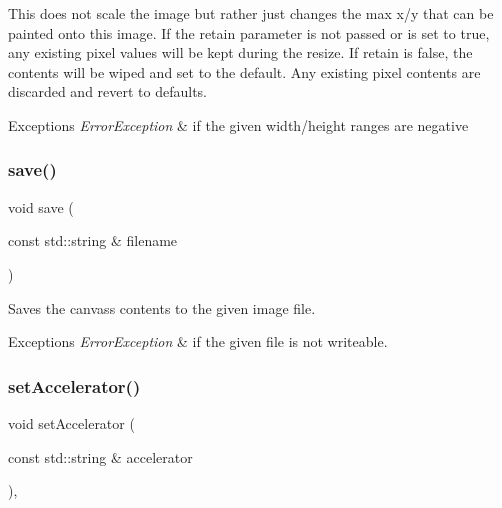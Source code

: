 This does not scale the image but rather just changes the max x/y that can be painted onto this image. If the \textquotesingle{}retain\textquotesingle{} parameter is not passed or is set to true, any existing pixel values will be kept during the resize. If \textquotesingle{}retain\textquotesingle{} is false, the contents will be wiped and set to the default. Any existing pixel contents are discarded and revert to defaults. 
\begin{DoxyExceptions}{Exceptions}
{\em Error\+Exception} & if the given width/height ranges are negative \\
\hline
\end{DoxyExceptions}
\mbox{\label{classsgl_1_1GCanvas_a2c027edbcd25b820dc6e21a9a3ad0496}} 
\subsubsection{\texorpdfstring{save()}{save()}}
{\footnotesize\ttfamily void save (\begin{DoxyParamCaption}\item[{const std\+::string \&}]{filename }\end{DoxyParamCaption})\hspace{0.3cm}{\ttfamily [virtual]}}



Saves the canvas\textquotesingle{}s contents to the given image file. 


\begin{DoxyExceptions}{Exceptions}
{\em Error\+Exception} & if the given file is not writeable. \\
\hline
\end{DoxyExceptions}
\mbox{\label{classsgl_1_1GInteractor_ad15f102f62e2960576012f1aa0ba4b2e}} 
\subsubsection{\texorpdfstring{set\+Accelerator()}{setAccelerator()}}
{\footnotesize\ttfamily void set\+Accelerator (\begin{DoxyParamCaption}\item[{const std\+::string \&}]{accelerator }\end{DoxyParamCaption})\hspace{0.3cm}{\ttfamily [virtual]}, {\ttfamily [inherited]}}




